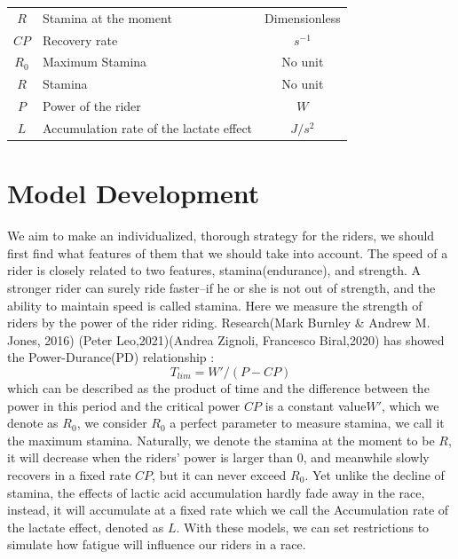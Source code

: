 \documentclass[12pt]{article}
\begin{document}
\begin{center}
{\begin{tabular}{clc}
            $R$           & Stamina at the moment                                   & Dimensionless \\
            $CP$          & Recovery rate                                           & $s^{-1}$      \\
            $R_0$         & Maximum Stamina                                         & No unit       \\
            $R$           & Stamina                                                 & No unit       \\
            $P$           & Power of the rider                                      & $W$           \\
            $L$           & Accumulation rate of the lactate effect                 & $J/s^2$       \\
            \bottomrule
        \end{tabular}
    }
\end{center}
\section{Model Development}
We aim to make an individualized, thorough strategy for the riders, we should first find what features of them that we should take into account.
The speed of a rider
is closely related to two features, stamina(endurance), and strength. A stronger rider can surely ride faster--if he or she is not out of strength, and the ability
to maintain speed is called stamina.
Here we measure the strength of riders by the power of the rider riding. Research(Mark Burnley \& Andrew M. Jones, 2016)\cite{doi:10.1080/17461391.2016.1249524}
(Peter Leo,2021)\cite{leo2021power}(Andrea Zignoli, Francesco Biral,2020)\cite{zignoli2020prediction}%
has showed the Power-Durance(PD) relationship : $$T_{lim}=W'/(P-CP)$$
which can be described as the product of time and the difference between the power in this period and the critical power $CP$ is a constant value$W'$, which we
denote as $R_0$, we consider $R_0$ a perfect parameter to measure stamina, we call it the maximum stamina. Naturally, we denote the stamina at the moment to be $R$, it
will decrease when the riders' power is larger than 0, and meanwhile slowly recovers in a fixed rate $CP$,
but it can never exceed $R_0$. Yet unlike the decline of stamina, the effects of lactic acid accumulation hardly fade away in the race, instead,
it will accumulate at a fixed rate which we call the Accumulation rate of the lactate effect, denoted as $L$. With these models, we can set restrictions
to simulate how fatigue will influence our riders in a race.
\end{document}

